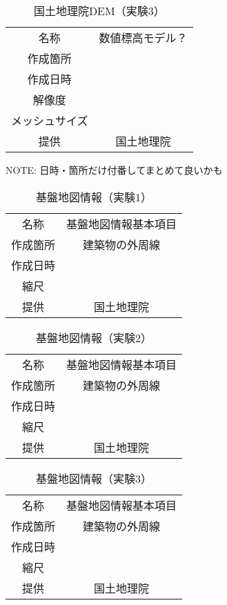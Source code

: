     \begin{table}[b]
      \centering
      \caption{国土地理院DEM（実験3）}
      \label{国土地理院DEM3}
      \begin{tabular}{cc}
        \hline
        名称 & 数値標高モデル？ \\
        作成箇所 &  \\
        作成日時 &  \\
        解像度 & \\
        メッシュサイズ &  \\
        提供 & 国土地理院 \\ \hline
      \end{tabular}
    \end{table}


    NOTE: 日時・箇所だけ付番してまとめて良いかも
    \begin{table}[b]
      \centering
      \caption{基盤地図情報（実験1）}
      \label{基盤地図情報1}
      \begin{tabular}{cc}
        \hline
        名称 & 基盤地図情報基本項目 \\
        作成箇所 & 建築物の外周線 \\
        作成日時 &  \\
        縮尺 & \\
        提供 & 国土地理院 \\ \hline
      \end{tabular}
    \end{table}


    \begin{table}[b]
      \centering
      \caption{基盤地図情報（実験2）}
      \label{基盤地図情報2}
      \begin{tabular}{cc}
        \hline
        名称 & 基盤地図情報基本項目 \\
        作成箇所 & 建築物の外周線 \\
        作成日時 &  \\
        縮尺 & \\
        提供 & 国土地理院 \\ \hline
      \end{tabular}
    \end{table}

    \begin{table}[b]
      \centering
      \caption{基盤地図情報（実験3）}
      \label{基盤地図情報3}
      \begin{tabular}{cc}
        \hline
        名称 & 基盤地図情報基本項目 \\
        作成箇所 & 建築物の外周線 \\
        作成日時 &  \\
        縮尺 & \\
        提供 & 国土地理院 \\ \hline
      \end{tabular}
    \end{table}



